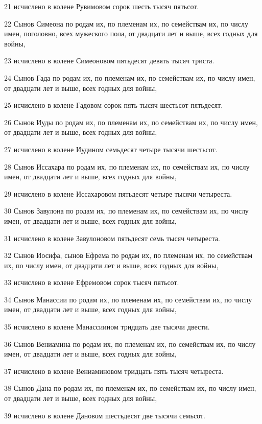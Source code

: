 \par 21 исчислено в колене Рувимовом сорок шесть тысяч пятьсот.
\par 22 Сынов Симеона по родам их, по племенам их, по семействам их, по числу имен, поголовно, всех мужеского пола, от двадцати лет и выше, всех годных для войны,
\par 23 исчислено в колене Симеоновом пятьдесят девять тысяч триста.
\par 24 Сынов Гада по родам их, по племенам их, по семействам их, по числу имен, от двадцати лет и выше, всех годных для войны,
\par 25 исчислено в колене Гадовом сорок пять тысяч шестьсот пятьдесят.
\par 26 Сынов Иуды по родам их, по племенам их, по семействам их, по числу имен, от двадцати лет и выше, всех годных для войны,
\par 27 исчислено в колене Иудином семьдесят четыре тысячи шестьсот.
\par 28 Сынов Иссахара по родам их, по племенам их, по семействам их, по числу имен, от двадцати лет и выше, всех годных для войны,
\par 29 исчислено в колене Иссахаровом пятьдесят четыре тысячи четыреста.
\par 30 Сынов Завулона по родам их, по племенам их, по семействам их, по числу имен, от двадцати лет и выше, всех годных для войны,
\par 31 исчислено в колене Завулоновом пятьдесят семь тысяч четыреста.
\par 32 Сынов Иосифа, сынов Ефрема по родам их, по племенам их, по семействам их, по числу имен, от двадцати лет и выше, всех годных для войны,
\par 33 исчислено в колене Ефремовом сорок тысяч пятьсот.
\par 34 Сынов Манассии по родам их, по племенам их, по семействам их, по числу имен, от двадцати лет и выше, всех годных для войны,
\par 35 исчислено в колене Манассиином тридцать две тысячи двести.
\par 36 Сынов Вениамина по родам их, по племенам их, по семействам их, по числу имен, от двадцати лет и выше, всех годных для войны,
\par 37 исчислено в колене Вениаминовом тридцать пять тысяч четыреста.
\par 38 Сынов Дана по родам их, по племенам их, по семействам их, по числу имен, от двадцати лет и выше, всех годных для войны,
\par 39 исчислено в колене Дановом шестьдесят две тысячи семьсот.
